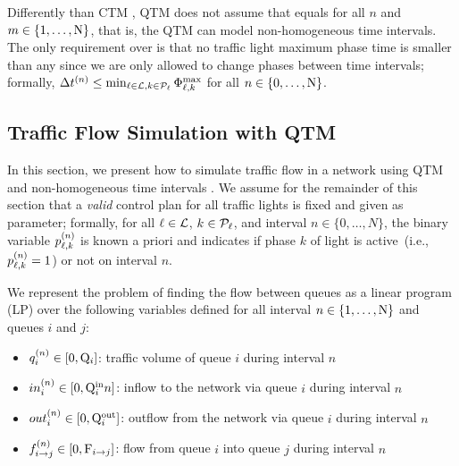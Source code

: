 Differently than CTM \cite{daganzo1994cell,lin2004enhanced}, QTM does not assume
that \DT[n] equals \DT[m] for all $n$ and $m \in \{1,\dots,\Nn\}$, that is, the
QTM can model non-homogeneous time intervals.
%
The only requirement over \DT[n] is that no traffic light maximum phase time is
smaller than any \DT[n] since we are only allowed to change phases between time
intervals; formally, $\DT[n] \le \min_{\tl \in \Lset, k \in \Pset_\tl}
\PTMAX{\tl}{k}$ for all $n \in \{0,\dots,\Nn\}$.






\newpage

\subsection{Traffic Flow Simulation with QTM}

In this section, we present how to simulate traffic flow in a network using QTM
and non-homogeneous time intervals \DT[].
%
We assume for the remainder of this section that a \emph{valid} control plan for
all traffic lights is fixed and given as parameter;
%
formally, for all $\tl \in \Lset$, $k \in \Pset_\tl$, and interval $n \in
\{0,\dots,N\}$, the binary variable $\p{\tl}{k}$ is known a priori and indicates
if phase $k$ of light \tl is active~(i.e., $\p{\tl}{k} = 1$) or not on interval
$n$.


We represent the problem of finding the flow between queues as a linear program
(LP) over the following variables defined for all interval $n \in
\{1,\dots,\Nn\}$ and queues $i$ and $j$:

\begin{itemize}
%
\item $\q{i} \in [0,\QMAX{i}]$: traffic volume of queue $i$ during interval $n$
%
\item $\inq{i} \in [0,\QIN{i}{n}]$: inflow to the network via queue $i$
during interval $n$
%
\item $\outq{i} \in [0,\QOUT{i}]$: outflow from the network via queue $i$ during
interval $n$
%
\item $\f{i}{j} \in [0,\FMAX{i}{j}]$: flow from queue $i$ into queue $j$ during
interval $n$
%
\end{itemize}

%

